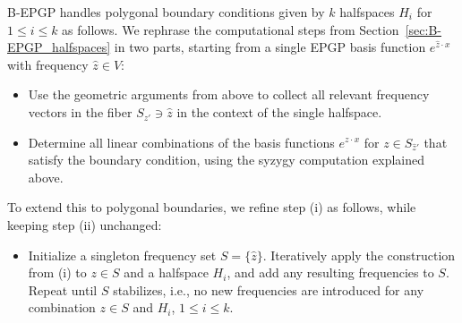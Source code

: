 \documentclass{article} %
\theoremstyle{plain}
\theoremstyle{definition}
\theoremstyle{remark}
\newcommand{\CC}{\mathbb{C}}
\begin{document}



B-EPGP handles polygonal boundary conditions given by $k$ halfspaces $H_i$ for $1\le i\le k$ as follows.
We rephrase the computational steps from Section~\ref{sec:B-EPGP_halfspaces} in two parts, starting from a single EPGP basis function $e^{\widehat{z} \cdot x}$ with frequency $\widehat{z} \in V$:
\begin{itemize}[noitemsep,topsep=0pt,parsep=0pt,partopsep=0pt]
    \item[(i)] Use the geometric arguments from above to collect all relevant frequency vectors in the fiber $S_{\widehat{z}'} \ni \widehat{z}$ in the context of the single halfspace.
    \item[(ii)] Determine all linear combinations of the basis functions $e^{z \cdot x}$ for $z \in S_{\widehat{z}'}$ that satisfy the boundary condition, using the syzygy computation explained above.
\end{itemize}

To extend this to polygonal boundaries, we refine step (i) as follows, while keeping step (ii) unchanged:
\begin{itemize}
    \item[(i')] Initialize a singleton frequency set $S = \{\widehat{z}\}$. Iteratively apply the construction from (i) to $z \in S$ and a halfspace $H_i$, and add any resulting frequencies to $S$. Repeat until $S$ stabilizes, i.e., no new frequencies are introduced for any combination $z \in S$ and $H_i$, $1\le i\le k$.
\end{itemize}
\end{document}
